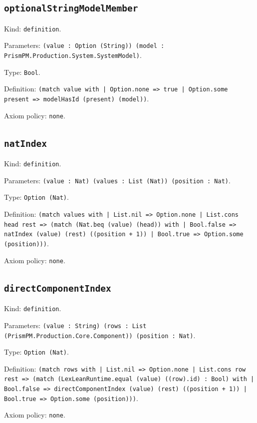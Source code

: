 \documentclass[11pt]{article}
\begin{document}
\subsection*{\texttt{optionalStringModelMember}}
\noindent Kind: \texttt{definition}.\par
\noindent Parameters: \texttt{(value : Option (String)) (model : PrismPM.Production.System.SystemModel)}.\par
\noindent Type: \texttt{Bool}.\par
\noindent Definition: \texttt{(match value with | Option.none => true | Option.some present => modelHasId (present) (model))}.\par
\noindent Axiom policy: \texttt{none}.\par
\subsection*{\texttt{natIndex}}
\noindent Kind: \texttt{definition}.\par
\noindent Parameters: \texttt{(value : Nat) (values : List (Nat)) (position : Nat)}.\par
\noindent Type: \texttt{Option (Nat)}.\par
\noindent Definition: \texttt{(match values with | List.nil => Option.none | List.cons head rest => (match (Nat.beq (value) (head)) with | Bool.false => natIndex (value) (rest) ((position + 1)) | Bool.true => Option.some (position)))}.\par
\noindent Axiom policy: \texttt{none}.\par
\subsection*{\texttt{directComponentIndex}}
\noindent Kind: \texttt{definition}.\par
\noindent Parameters: \texttt{(value : String) (rows : List (PrismPM.Production.Core.Component)) (position : Nat)}.\par
\noindent Type: \texttt{Option (Nat)}.\par
\noindent Definition: \texttt{(match rows with | List.nil => Option.none | List.cons row rest => (match (LexLeanRuntime.equal (value) ((row).id) : Bool) with | Bool.false => directComponentIndex (value) (rest) ((position + 1)) | Bool.true => Option.some (position)))}.\par
\noindent Axiom policy: \texttt{none}.\par
\end{document}
